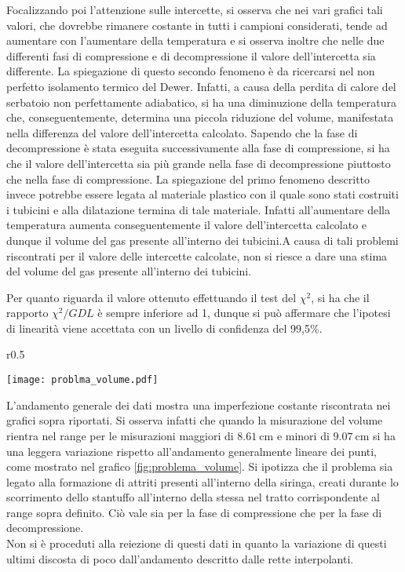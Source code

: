 \documentclass[a4paper,11pt,oneside]{article}
\begin{document}
Focalizzando poi l'attenzione sulle intercette, si osserva che nei vari grafici tali valori, che dovrebbe rimanere costante in tutti i campioni considerati, tende ad aumentare con l'aumentare della temperatura e si osserva inoltre che nelle due differenti fasi di compressione e di decompressione il valore dell'intercetta sia  differente. La spiegazione di questo secondo fenomeno è da ricercarsi nel non perfetto isolamento termico del Dewer. Infatti, a causa della perdita di calore del serbatoio non perfettamente adiabatico, si ha una diminuzione della temperatura che, conseguentemente, determina una piccola riduzione del volume, manifestata nella differenza del valore dell'intercetta calcolato. Sapendo che la fase di decompressione è stata eseguita successivamente alla fase di compressione, si ha che il valore dell'intercetta sia più grande nella fase di decompressione piuttosto che nella fase di compressione. La spiegazione del primo fenomeno descritto invece potrebbe essere legata al materiale plastico con il quale sono stati costruiti i tubicini e alla dilatazione termina di tale materiale. Infatti all'aumentare della temperatura aumenta conseguentemente il valore dell'intercetta calcolato e dunque il volume del gas presente all'interno dei tubicini.A causa di tali problemi riscontrati per il valore delle intercette calcolate, non si riesce a dare una stima del volume del gas presente all'interno dei tubicini.


Per quanto riguarda il valore ottenuto effettuando il test del $\chi^2$, si ha che il rapporto $\chi^2/GDL$ è sempre inferiore ad 1, dunque si può affermare che l'ipotesi di linearità viene accettata con un livello di confidenza del 99,5\%.

\begin{wrapfigure}{r}{0.5\textwidth}
  \begin{center}
    \texttt{[image: problma\_volume.pdf]}
  \end{center}
  \caption{Zoom volume}
  \label{fig:problema_volume}
\end{wrapfigure}
L'andamento generale dei dati mostra una imperfezione costante riscontrata nei grafici sopra riportati.
Si osserva infatti che quando la misurazione del volume rientra nel range per le misurazioni maggiori di $\SI{8,61}{\centi\meter}$ e minori di $\SI{9,07}{\centi\meter}$ si ha una leggera variazione rispetto all'andamento generalmente lineare dei punti, come mostrato nel grafico \ref{fig:problema_volume}. Si ipotizza che il problema sia legato alla formazione di attriti presenti all'interno della siringa, creati durante lo scorrimento dello stantuffo all'interno della stessa nel tratto corrispondente al range sopra definito. Ciò vale sia per la fase di compressione che per la fase di decompressione.\\
Non si è proceduti alla reiezione di questi dati in quanto la variazione di questi ultimi discosta di poco dall'andamento descritto dalle rette interpolanti.
\end{document}
